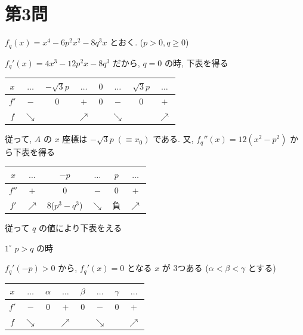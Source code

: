 \documentclass[../main.tex]{subfiles}
\begin{document}
\newpage

\section*{第3問}

\noindent
[\textbf{解}] $f_q(x) = x^4 - 6p^2 x^2 - 8q^3 x$ とおく. ($p > 0, q \ge 0$)

$f_q'(x) = 4x^3 - 12p^2 x - 8q^3$ だから, $q=0$ の時, 下表を得る

\begin{center}
  \begin{tabular}{c|c|c|c|c|c|c|c}
    $x$ & $\dots$ & $-\sqrt{3}p$ & $\dots$ & $0$ & $\dots$ & $\sqrt{3}p$ & $\dots$ \\ \hline
    $f'$ & $-$ & $0$ & $+$ & $0$ & $-$ & $0$ & $+$ \\ \hline
    $f$ & $\searrow$ & & $\nearrow$ & & $\searrow$ & & $\nearrow$
  \end{tabular}
\end{center}

\noindent
従って, $A$ の $x$ 座標は $-\sqrt{3}p \; (\equiv x_0)$ である. 又, $f_q''(x) = 12(x^2 - p^2)$ から下表を得る

\begin{center}
  \begin{tabular}{c|c|c|c|c|c}
    $x$ & $\dots$ & $-p$ & $\dots$ & $p$ & $\dots$ \\ \hline
    $f''$ & $+$ & $0$ & $-$ & $0$ & $+$ \\ \hline
    $f'$ & $\nearrow$ & 8($p^3-q^3$) & $\searrow$ & 負 & $\nearrow$
  \end{tabular}
\end{center}

\noindent
従って $q$ の値により下表をえる

\bigskip
\noindent
$1^\circ$ $p > q$ の時

$f_q'(-p) > 0$ から, $f_q'(x) = 0$ となる $x$ が 3つある ($\alpha < \beta < \gamma$ とする)

\begin{center}
  \begin{tabular}{c|c|c|c|c|c|c|c}
    $x$ & $\dots$ & $\alpha$ & $\dots$ & $\beta$ & $\dots$ & $\gamma$ & $\dots$ \\ \hline
    $f'$ & $-$ & $0$ & $+$ & $0$ & $-$ & $0$ & $+$ \\ \hline
    $f$ & $\searrow$ & & $\nearrow$ & & $\searrow$ & & $\nearrow$
  \end{tabular}
\end{center}
\end{document}
